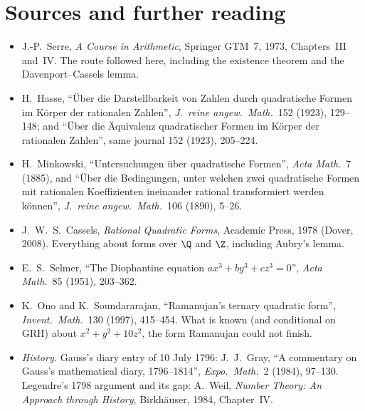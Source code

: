 \section*{Sources and further reading}

\begin{itemize}
\item J.-P.~Serre, \emph{A Course in Arithmetic}, Springer GTM~7, 1973, Chapters~III and~IV. The route followed here, including the
existence theorem and the Davenport--Cassels lemma.
\item H.~Hasse, ``\"Uber die Darstellbarkeit von Zahlen durch quadratische Formen im K\"orper der rationalen Zahlen'', \emph{J.\
reine angew.\ Math.}\ 152 (1923), 129--148; and ``\"Uber die \"Aquivalenz quadratischer Formen im K\"orper der rationalen Zahlen'',
same journal 152 (1923), 205--224.
\item H.~Minkowski, ``Untersuchungen \"uber quadratische Formen'', \emph{Acta Math.}\ 7 (1885), and ``\"Uber die Bedingungen, unter
welchen zwei quadratische Formen mit rationalen Koeffizienten ineinander rational transformiert werden k\"onnen'', \emph{J.\ reine
angew.\ Math.}\ 106 (1890), 5--26.
\item J.~W.~S.~Cassels, \emph{Rational Quadratic Forms}, Academic Press, 1978 (Dover, 2008). Everything about forms over $\Q$ and
$\Z$, including Aubry's lemma.
\item E.~S.~Selmer, ``The Diophantine equation $ax^3+by^3+cz^3=0$'', \emph{Acta Math.}\ 85 (1951), 203--362.
\item K.~Ono and K.~Soundararajan, ``Ramanujan's ternary quadratic form'', \emph{Invent.\ Math.}\ 130 (1997), 415--454. What is
known (and conditional on GRH) about $x^2+y^2+10z^2$, the form Ramanujan could not finish.
\item \emph{History.} Gauss's diary entry of 10 July 1796: J.~J.~Gray, ``A commentary on Gauss's mathematical diary,
1796--1814'', \emph{Expo.\ Math.}\ 2 (1984), 97--130. Legendre's 1798 argument and its gap: A.~Weil, \emph{Number Theory: An
Approach through History}, Birkh\"auser, 1984, Chapter~IV.
\end{itemize}
